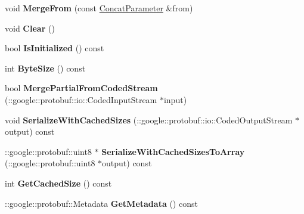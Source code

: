 \begin{DoxyCompactItemize}
\item 
\mbox{\label{classcaffe_1_1_concat_parameter_a61f89193d1a9d0ea7d0b864e9726b4f5}} 
void {\bfseries Merge\+From} (const \mbox{\hyperlink{classcaffe_1_1_concat_parameter}{Concat\+Parameter}} \&from)
\item 
\mbox{\label{classcaffe_1_1_concat_parameter_ad13d427739495b3a5239cd117a55b125}} 
void {\bfseries Clear} ()
\item 
\mbox{\label{classcaffe_1_1_concat_parameter_a2e35298de397403ad3df1c0196e5bcb5}} 
bool {\bfseries Is\+Initialized} () const
\item 
\mbox{\label{classcaffe_1_1_concat_parameter_aa9ef0004be47f44ddc1dacd6d690dc35}} 
int {\bfseries Byte\+Size} () const
\item 
\mbox{\label{classcaffe_1_1_concat_parameter_a43bd17504792846e33eb5f2b3bfd9ab5}} 
bool {\bfseries Merge\+Partial\+From\+Coded\+Stream} (\+::google\+::protobuf\+::io\+::\+Coded\+Input\+Stream $\ast$input)
\item 
\mbox{\label{classcaffe_1_1_concat_parameter_a10acb35da1833e934b94795472939f0a}} 
void {\bfseries Serialize\+With\+Cached\+Sizes} (\+::google\+::protobuf\+::io\+::\+Coded\+Output\+Stream $\ast$output) const
\item 
\mbox{\label{classcaffe_1_1_concat_parameter_a58b85db828859f211664229fa6fea09e}} 
\+::google\+::protobuf\+::uint8 $\ast$ {\bfseries Serialize\+With\+Cached\+Sizes\+To\+Array} (\+::google\+::protobuf\+::uint8 $\ast$output) const
\item 
\mbox{\label{classcaffe_1_1_concat_parameter_a0a774fe9336da1e0ff7db2d93fabea50}} 
int {\bfseries Get\+Cached\+Size} () const
\item 
\mbox{\label{classcaffe_1_1_concat_parameter_a55ad45b2511c87b75b4c9ce6a9c0a30e}} 
\+::google\+::protobuf\+::\+Metadata {\bfseries Get\+Metadata} () const
\item 

\end{DoxyCompactItemize}

